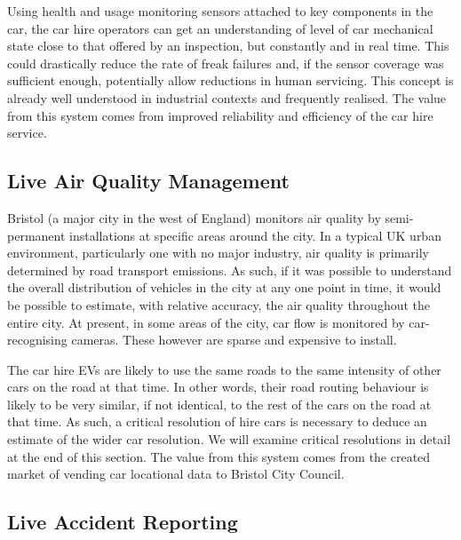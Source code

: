 \documentclass[journal]{IEEEtran}
\begin{document}
Using health and usage monitoring sensors attached to key components
in the car, the car hire operators can get an understanding of level
of car mechanical state close to that offered by an inspection, but
constantly and in real time. This could drastically reduce the rate of
freak failures and, if the sensor coverage was sufficient enough,
potentially allow reductions in human servicing.  This concept is
already well understood in industrial contexts and frequently
realised. The value from this system comes from improved reliability
and efficiency of the car hire service.


\subsection{Live Air Quality Management}

Bristol (a major city in the west of England) monitors air quality by
semi-permanent installations at specific areas around the city.  In a
typical UK urban environment, particularly one with no major industry,
air quality is primarily determined by road transport emissions.  As
such, if it was possible to understand the overall distribution of
vehicles in the city at any one point in time, it would be possible to
estimate, with relative accuracy, the air quality throughout the
entire city. At present, in some areas of the city, car flow is
monitored by car-recognising cameras. These however are sparse and
expensive to install.

The car hire EVs are likely to use the same roads to the same
intensity of other cars on the road at that time. In other words,
their road routing behaviour is likely to be very similar, if not
identical, to the rest of the cars on the road at that time. As such,
a critical resolution of hire cars is necessary to deduce an estimate
of the wider car resolution. We will examine critical resolutions in
detail at the end of this section.  The value from this system comes
from the created market of vending car locational data to Bristol City
Council.


\subsection{Live Accident Reporting}
\end{document}
